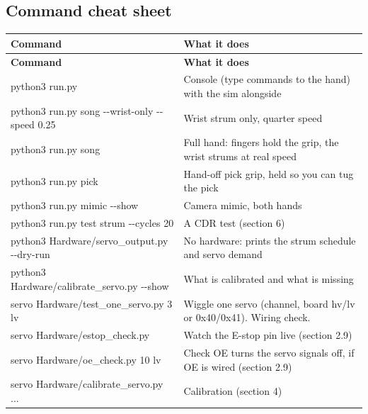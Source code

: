 \documentclass[11pt,letterpaper]{article}
\newcommand{\code}[1]{\textcolor{codeblue}{\ttfamily\smaller\relax #1}}
\begin{document}
\subsection{Command cheat sheet}
{\small
\begin{longtable}{|>{\raggedright\arraybackslash}p{}|>{\raggedright\arraybackslash}p{}|}
\hline
\rowcolor{tblhead}\textbf{Command} & \textbf{What it does} \\ \hline
\endfirsthead
\hline
\rowcolor{tblhead}\textbf{Command} & \textbf{What it does} \\ \hline
\endhead
\code{python3 run.py} & Console (type commands to the hand) with the sim alongside \\ \hline
\code{python3 run.py song -{}-{}wrist-{}\allowbreak{}only -{}-{}speed 0.25} & Wrist strum only, quarter speed \\ \hline
\code{python3 run.py song} & Full hand: fingers hold the grip, the wrist strums at real speed \\ \hline
\code{python3 run.py pick} & Hand-off pick grip, held so you can tug the pick \\ \hline
\code{python3 run.py mimic -{}-{}show} & Camera mimic, both hands \\ \hline
\code{python3 run.py test strum -{}-{}cycles 20} & A CDR test (section 6) \\ \hline
\code{python3 Hardware/\allowbreak{}servo\_\allowbreak{}output.py -{}-{}dry-{}\allowbreak{}run} & No hardware: prints the strum schedule and servo demand \\ \hline
\code{python3 Hardware/\allowbreak{}calibrate\_\allowbreak{}servo.py -{}-{}show} & What is calibrated and what is missing \\ \hline
\code{servo Hardware/\allowbreak{}test\_\allowbreak{}one\_\allowbreak{}servo.py 3 lv} & Wiggle one servo (channel, board \code{hv}/\code{lv} or 0x40/0x41). Wiring check. \\ \hline
\code{servo Hardware/\allowbreak{}estop\_\allowbreak{}check.py} & Watch the E-stop pin live (section 2.9) \\ \hline
\code{servo Hardware/\allowbreak{}oe\_\allowbreak{}check.py 10 lv} & Check OE turns the servo signals off, if OE is wired (section 2.9) \\ \hline
\code{servo Hardware/\allowbreak{}calibrate\_\allowbreak{}servo.py ...} & Calibration (section 4) \\ \hline
\end{longtable}}
\end{document}
